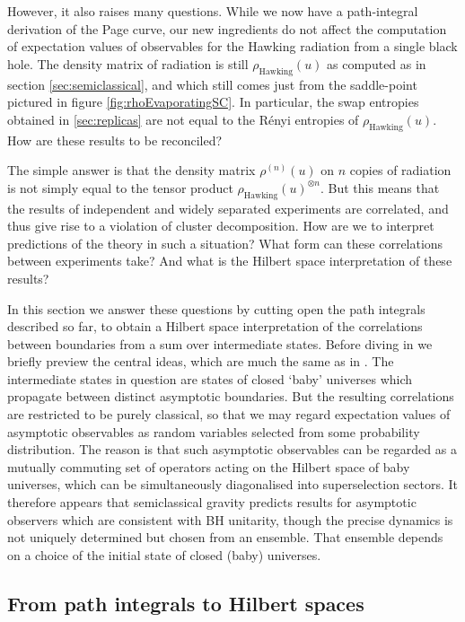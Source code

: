 \documentclass[letterpaper,12pt]{article}
\begin{document}
However, it also raises many questions.  While  we now have a path-integral derivation of the Page curve, our new ingredients do not affect the computation of expectation values of observables for the Hawking radiation from a single black hole. The density matrix of radiation is still $\rho_\text{Hawking}(u)$ as computed as in section \ref{sec:semiclassical}, and which still comes just from the saddle-point pictured in figure \ref{fig:rhoEvaporatingSC}.  In particular, the swap entropies obtained in \ref{sec:replicas} are not equal to the R\'enyi entropies of $\rho_\text{Hawking}(u)$. How are these results to be reconciled?

The simple answer is that the density matrix $\rho^{(n)}(u)$ on $n$ copies of radiation is not simply equal to the tensor product $\rho_\text{Hawking}(u)^{\otimes n}$. But this means that
the results of independent and widely separated experiments are correlated, and thus give rise to a violation of cluster decomposition. How are we to interpret predictions of the theory in such a situation? What form can these correlations between experiments take? And what is the Hilbert space interpretation of these results?

In this section we answer these questions by cutting open the path integrals described so far, to obtain a Hilbert space interpretation of the correlations between boundaries from a sum over intermediate states. Before diving in we briefly preview the central ideas, which are much the same as in \cite{Coleman:1988cy,Giddings:1988cx,Polchinski:1994zs}. The intermediate states in question are states of closed `baby' universes which propagate between distinct asymptotic boundaries.  But the resulting correlations are restricted to be purely classical, so that we may regard expectation values of asymptotic observables as random variables selected from some probability distribution. The reason is that such asymptotic observables can be regarded as a mutually commuting set of operators acting on the Hilbert space of baby universes, which can be simultaneously diagonalised into superselection sectors. It therefore appears that semiclassical gravity predicts results for asymptotic observers which are consistent with BH unitarity, though the precise dynamics is not uniquely determined but chosen from an ensemble. That ensemble depends on a choice of the initial state of closed (baby) universes.

\subsection{From path integrals to Hilbert spaces}
\end{document}
